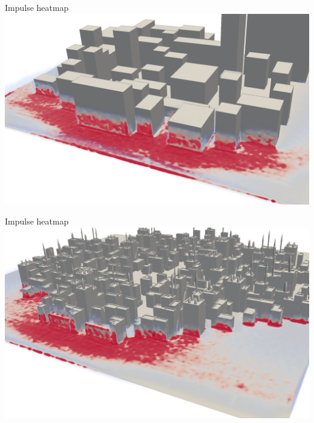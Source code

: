 \documentclass[8pt,sans,mathserif,aspectratio=43]{beamer}
\begin{document}
\begin{frame}{Impulse heatmap}
  \includegraphics[width=\textwidth]{figures/impulse-heatmap-1.png}
\end{frame}


\begin{frame}{Impulse heatmap}
  \includegraphics[width=\textwidth]{figures/impulse-heatmap-2.png}
\end{frame}

\end{document}
